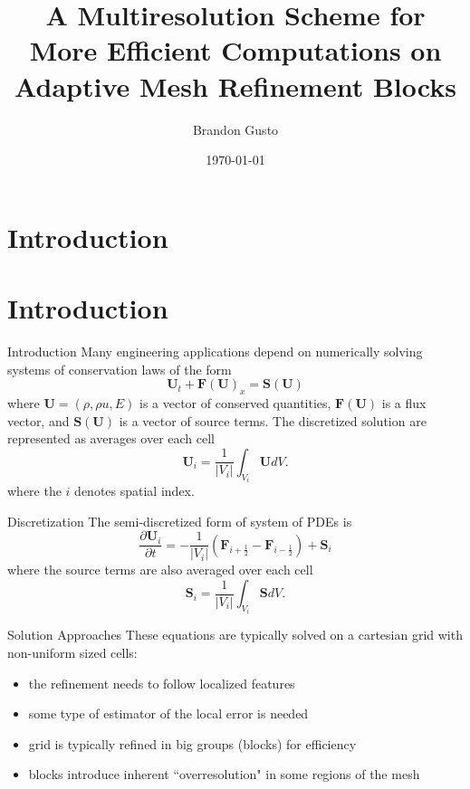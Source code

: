 \documentclass{beamer}
\begin{document}
\section{Introduction}
\title{A Multiresolution Scheme for More Efficient Computations on Adaptive Mesh Refinement Blocks}
\author{Brandon Gusto} %
\date{\today}
\frame{\titlepage}

\section{Introduction}

\begin{frame}{Introduction}
    Many engineering applications depend on numerically solving systems of conservation laws of the form
    \begin{equation*}
        \mathbf{U}_{t} + \mathbf{F}(\mathbf{U})_{x} = \mathbf{S}(\mathbf{U})
    \end{equation*}
    where $\mathbf{U} = (\rho,\rho u,E)$ is a vector of conserved quantities,
    $\mathbf{F}(\mathbf{U})$ is a flux vector, and $\mathbf{S}(\mathbf{U})$ is a
    vector of source terms. The discretized solution are represented as
    averages over each cell
    \begin{equation*}
        \mathbf{U}_{i} = \frac{1}{|V_{i}|} \int_{V_{i}} \mathbf{U} dV.
    \end{equation*}
    where the $i$ denotes spatial index.
\end{frame}

\begin{frame}{Discretization}
    The semi-discretized form of system of PDEs is
    \begin{equation*}
        \frac{\partial \mathbf{U}_{i}}{\partial t} = -\frac{1}{|V_{i}|} \left( \mathbf{F}_{i+\frac{1}{2}}
            - \mathbf{F}_{i-\frac{1}{2}} \right) + \mathbf{S}_{i}
    \end{equation*}
    where the source terms are also averaged over each cell
    \begin{equation*}
        \mathbf{S}_{i} = \frac{1}{|V_{i}|} \int_{V_{i}} \mathbf{S} dV.
    \end{equation*}

\end{frame}

\begin{frame}{Solution Approaches}
    These equations are typically solved on a cartesian grid with non-uniform sized cells:
    \begin{itemize}
        \item<2-> the refinement needs to follow localized features
        \item<3-> some type of estimator of the local error is needed
        \item<4-> grid is typically refined in big groups (blocks) for efficiency
        \item<5-> blocks introduce inherent ``overresolution" in some regions of the mesh
    \end{itemize}
\end{frame}
\end{document}
